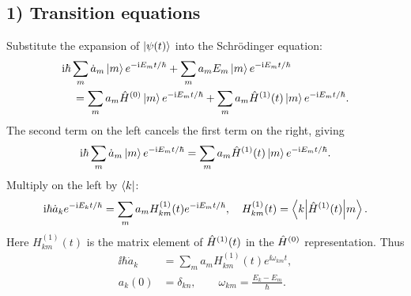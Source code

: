 \subsection*{1) Transition equations}
Substitute the expansion of $\left|\psi(t)\right\rangle$ into the Schr\"odinger equation:
\begin{equation}\begin{aligned}
 &\mathrm{i}\hbar\sum_m\dot a_m\left|m\right\rangle e^{-\mathrm{i} E_mt/\hbar}
 +\sum_m a_mE_m\left|m\right\rangle e^{-\mathrm{i} E_mt/\hbar}\\
 &\quad=\sum_m a_m\hat{H}^{(0)}\left|m\right\rangle e^{-\mathrm{i} E_mt/\hbar}
 +\sum_m a_m\hat{H}^{(1)}(t)\left|m\right\rangle e^{-\mathrm{i} E_mt/\hbar}.
\end{aligned}\end{equation}
The second term on the left cancels the first term on the right, giving
\begin{equation}
 \mathrm{i}\hbar\sum_m\dot a_m\left|m\right\rangle e^{-\mathrm{i} E_mt/\hbar}
 =\sum_m a_m\hat{H}^{(1)}(t)\left|m\right\rangle e^{-\mathrm{i} E_mt/\hbar}.
\end{equation}
Multiply on the left by $\left\langle k\right|$:
\begin{equation}
 \mathrm{i}\hbar\dot a_ke^{-\mathrm{i} E_kt/\hbar}
 =\sum_m a_m H_{km}^{(1)}(t)e^{-\mathrm{i} E_mt/\hbar},
 \quad H_{km}^{(1)}(t)=\left\langle k\middle|\hat{H}^{(1)}(t)\middle|m\right\rangle.
\end{equation}
Here $H_{km}^{(1)}(t)$ is the matrix element of $\hat{H}^{(1)}(t)$ in the $\hat{H}^{(0)}$ representation. Thus
\begin{equation}
 \boxed{\begin{aligned}
 \ii\hbar\dot a_k&=\sum_m a_m H_{km}^{(1)}(t)e^{\ii\omega_{km}t},\\
 a_k(0)&=\delta_{kn},\qquad \omega_{km}=\frac{E_k-E_m}{\hbar}.
 \end{aligned}}
\end{equation}
